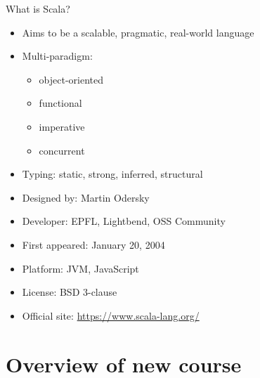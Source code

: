 \documentclass{lecturenotes}
\newcommand{\Section}[1]{\section{#1}\frame{\centering\huge\bfseries\textcolor{blue}{#1}}}
\begin{document}
\begin{Slide}{What is Scala?}
\begin{itemize}
\item Aims to be a scalable, pragmatic, real-world language
\item Multi-paradigm:  
\begin{itemize}
\item object-oriented 
\item functional 
\item imperative 
\item concurrent
\end{itemize}
\item Typing: static, strong, inferred, structural

\item Designed by: Martin Odersky
\item Developer: EPFL, Lightbend, OSS Community
\item First appeared:  January 20, 2004
\item Platform: JVM, JavaScript
\item License: BSD 3-clause
\item Official site: \url{https://www.scala-lang.org/}
\end{itemize}


\end{Slide}


\Section{Overview of new course}
\end{document}
